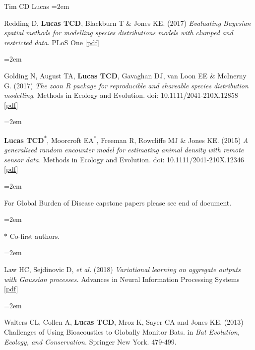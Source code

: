 \documentclass{scrartcl}
\newcommand{\MarginText}[1]{\marginpar{\raggedleft\itshape\small#1}} %
\newcommand{\Description}[1]{\hangindent=2em\hangafter=0\noindent\raggedright\footnotesize{#1}\par\normalsize\vspace{1em}} %
\begin{document}
\begin{cv}{Tim {\Large CD} Lucas}
\Description{\MarginText{2017}Redding D, \textbf{Lucas TCD}, Blackburn T \& Jones KE. (2017) \emph{Evaluating Bayesian spatial methods for modelling species distributions models with clumped and restricted data.} PLoS One [\href{https://journals.plos.org/plosone/article/file?id=10.1371/journal.pone.0187602&type=printable}{pdf}]}

\Description{Golding N, August TA, \textbf{Lucas TCD}, Gavaghan DJ, van Loon EE \& McInerny G. (2017) \emph{The zoon R package for reproducible and shareable species distribution modelling}. Methods in Ecology and Evolution. doi: 10.1111/2041-210X.12858 [\href{http://onlinelibrary.wiley.com/doi/10.1111/2041-210X.12858/pdf}{pdf}]}

\Description{\MarginText{2015}\textbf{Lucas TCD}\textsuperscript{$\ast$}, Moorcroft EA\textsuperscript{$\ast$}, Freeman R, Rowcliffe MJ \& Jones KE. (2015) \emph{A generalised random encounter model for estimating animal density with remote sensor data.} Methods in Ecology and Evolution. doi: 10.1111/2041-210X.12346 [\href{http://onlinelibrary.wiley.com/doi/10.1111/2041-210X.12346/epdf}{pdf}]}


\Description{\MarginText{GBD}For Global Burden of Disease capstone papers please see end of document.}

\Description{\MarginText{} \scriptsize{ $\ast$ Co-first authors. } }



{\color{Maroon}}\vspace{1em}


\Description{\MarginText{2018}Law HC, Sejdinovic D, \emph{et al.} (2018) \emph{Variational learning on aggregate outputs with Gaussian processes.} Advances in Neural Information Processing Systems [\href{http://papers.nips.cc/paper/7847-variational-learning-on-aggregate-outputs-with-gaussian-processes.pdf}{pdf}]}

\Description{\MarginText{2013}Walters CL, Collen A, \textbf{Lucas TCD}, Mroz K, Sayer CA and Jones KE. (2013) Challenges of Using Bioacoustics to Globally Monitor Bats. in \emph{Bat Evolution, Ecology, and Conservation.} Springer New York. 479-499.}

\vspace{1em} %




{\color{Maroon}}\vspace{1em}  %




\end{cv}
\end{document}
